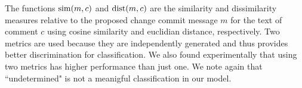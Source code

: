 The functions $\operatorname{sim}(m,c)$ and $\operatorname{dist}(m,c)$ are the similarity and dissimilarity measures relative to the proposed change commit message $m$ for the text of comment $c$ using cosine similarity and euclidian distance, respectively.
Two metrics are used because they are independently generated and thus provides better discrimination for classification.
We also found experimentally that using two metrics has higher performance than just one. We note again that ``undetermined" is not a meanigful classification in our model.


%
%
%
%
